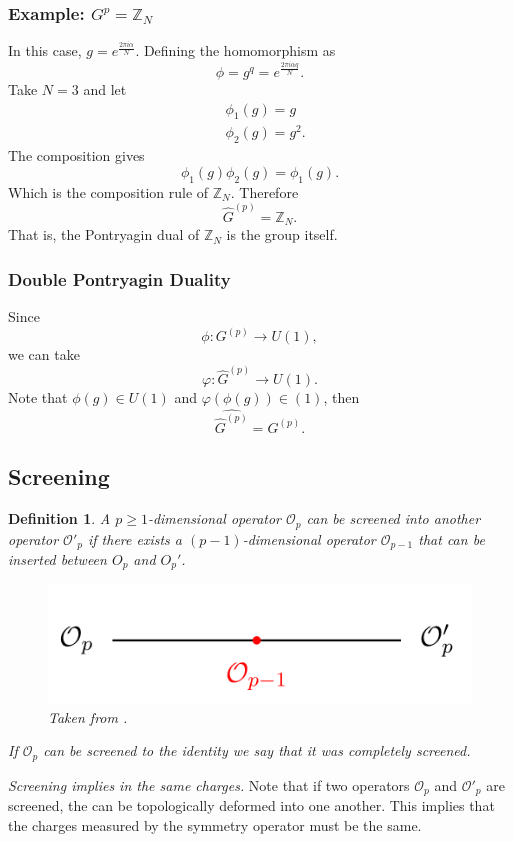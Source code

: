 \documentclass{article}
\newtheorem{definition}{Definition}
\begin{document}
\subsubsection*{Example: $G^{p}=\mathbb{Z}_N$}
In this case, $g=e^{\frac{2\pi i\alpha}{N}}$. Defining the homomorphism as 
\begin{equation}
	\phi=g^q=e^{\frac{2\pi i\alpha q}{N}}.
\end{equation}
Take $N=3$ and let 
\begin{align}
	&\phi_1(g)=g\\
	&\phi_2(g)=g^2. 
\end{align}
The composition gives 
\begin{equation}
	\phi_1(g)\phi_2(g)=\phi_1(g).
\end{equation}
Which is the composition rule of $\mathbb{Z}_N$. Therefore
\begin{equation}
	\widehat{G}^{(p)}=\mathbb{Z}_N.
\end{equation}
That is, the Pontryagin dual of $\mathbb{Z}_N$ is the group itself. 
\subsubsection*{Double Pontryagin Duality}
Since 
\begin{equation}
	\phi:G^{(p)}\to U(1),
\end{equation}
we can take 
\begin{equation}
	\varphi:\widehat{G}^{(p)}\to U(1). 
\end{equation}
Note that $\phi(g)\in U(1)$ and $\varphi(\phi(g))\in (1)$, then 
\begin{equation}
\widehat{\widehat{G}^{(p)}}=G^{(p)}.
\end{equation}

\subsection{Screening}
\begin{definition}
	A $p\geq 1$-dimensional operator $\mathcal{O}_p$ can be screened into another operator $\mathcal{O}'_p$ if there exists a $(p-1)$-dimensional operator $\mathcal{O}_{p-1}$ that can be inserted between $O_p$ and $O_p'$. 
	\begin{figure}[H]
		\centering
		\includegraphics[scale=0.4]{figures/screening.png}
		\caption{Taken from \cite{Bhardwaj}.}
	\end{figure}
If $\mathcal{O}_p$ can be screened to the identity we say that it was completely screened. 
\end{definition}
\textit{Screening implies in the same charges.} Note that if two operators $\mathcal{O}_p$ and $\mathcal{O}'_p$ are screened, the can be topologically deformed into one another. This implies that the charges measured by the symmetry operator must be the same. 

\nocite{*}


\end{document}
